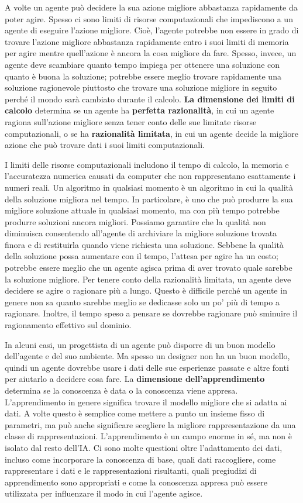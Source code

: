 \documentclass[a4paper]{extarticle}
\begin{document}
A volte un agente può decidere la sua azione migliore abbastanza rapidamente da poter agire. Spesso ci sono limiti di risorse computazionali che impediscono a un agente di eseguire l'azione migliore. Cioè, l'agente potrebbe non essere in grado di trovare l'azione migliore abbastanza rapidamente entro i suoi limiti di memoria per agire mentre quell'azione è ancora la cosa migliore da fare. Spesso, invece, un agente deve scambiare quanto tempo impiega per ottenere una soluzione con quanto è buona la soluzione; potrebbe essere meglio trovare rapidamente una soluzione ragionevole piuttosto che trovare una soluzione migliore in seguito perché il mondo sarà cambiato durante il calcolo. \textbf{La dimensione dei limiti di calcolo} determina se un agente ha \textbf{perfetta razionalità}, in cui un agente ragiona sull'azione migliore senza tener conto delle sue limitate risorse computazionali, o se ha \textbf{razionalità limitata}, in cui un agente decide la migliore azione che può trovare dati i suoi limiti computazionali.

I limiti delle risorse computazionali includono il tempo di calcolo, la memoria e l'accuratezza numerica causati da computer che non rappresentano esattamente i numeri reali. Un algoritmo in qualsiasi momento è un algoritmo in cui la qualità della soluzione migliora nel tempo. In particolare, è uno che può produrre la sua migliore soluzione attuale in qualsiasi momento, ma con più tempo potrebbe produrre soluzioni ancora migliori. Possiamo garantire che la qualità non diminuisca consentendo all'agente di archiviare la migliore soluzione trovata finora e di restituirla quando viene richiesta una soluzione. Sebbene la qualità della soluzione possa aumentare con il tempo, l'attesa per agire ha un costo; potrebbe essere meglio che un agente agisca prima di aver trovato quale sarebbe la soluzione migliore. Per tenere conto della razionalità limitata, un agente deve decidere se agire o ragionare più a lungo. Questo è difficile perché un agente in genere non sa quanto sarebbe meglio se dedicasse solo un po' più di tempo a ragionare. Inoltre, il tempo speso a pensare se dovrebbe ragionare può sminuire il ragionamento effettivo sul dominio.

In alcuni casi, un progettista di un agente può disporre di un buon modello dell'agente e del suo ambiente. Ma spesso un designer non ha un buon modello, quindi un agente dovrebbe usare i dati delle sue esperienze passate e altre fonti per aiutarlo a decidere cosa fare. La \textbf{dimensione dell'apprendimento} determina se la conoscenza è data o la conoscenza viene appresa. L'apprendimento in genere significa trovare il modello migliore che si adatta ai dati. A volte questo è semplice come mettere a punto un insieme fisso di parametri, ma può anche significare scegliere la migliore rappresentazione da una classe di rappresentazioni. L'apprendimento è un campo enorme in sé, ma non è isolato dal resto dell'IA. Ci sono molte questioni oltre l'adattamento dei dati, incluso come incorporare la conoscenza di base, quali dati raccogliere, come rappresentare i dati e le rappresentazioni risultanti, quali pregiudizi di apprendimento sono appropriati e come la conoscenza appresa può essere utilizzata per influenzare il modo in cui l'agente agisce.
\end{document}
